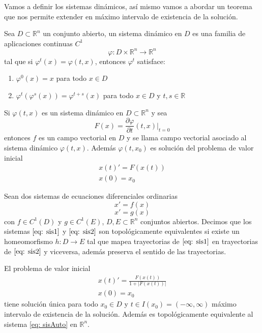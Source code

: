 Vamos a definir los sistemas dinámicos, así mismo vamos a abordar un teorema que nos permite extender en máximo intervalo de existencia de la solución.
 
\begin{definition}
	Sea $D\subset\mathbb{R}^n$ un conjunto abierto, un sistema dinámico en $D$ es una familia de aplicaciones continuas $C^1$
	$$\varphi:D\times\mathbb{R}^n\to\mathbb{R}^n$$
	tal que si $\varphi^t(x)=\varphi(t,x)$, entonces $\varphi^t$ satisface:
	\begin{enumerate}
		\item $\varphi^0(x)=x$ para todo $x\in D$
		\item $\varphi^t(\varphi^s(x))=\varphi^{t+s}(x)$ para todo $x\in D$ y $t,s\in\mathbb{R}$
	\end{enumerate}
\end{definition}

Si $\varphi(t,x)$ es un sistema dinámico en $D\subset\mathbb{R}^n$ y sea 
$$F(x)= \frac{\partial\varphi}{\partial t}(t,x)|_{t=0}$$
entonces $f$ es un campo vectorial en $D$ y se llama campo vectorial asociado al sistema dinámico $\varphi(t,x)$. Además $\varphi(t,x_0)$ es solución del problema de valor inicial
\begin{equation}\label{eq: sisAuto}
	\begin{matrix}
		x(t)'= F(x(t))\\
		x(0)=x_0
	\end{matrix}
\end{equation}

\begin{definition}
	Sean dos sistemas de ecuaciones diferenciales ordinarias
	\begin{equation}\label{eq: sis1}
		x'=f(x)
	\end{equation}
	\begin{equation}\label{eq: sis2}
		x'=g(x)
	\end{equation}
	con $f\in C^1(D)$ y $g\in C^1(E)$, $D,E\subset\mathbb{R}^n$ conjuntos abiertos. Decimos que los sistemas $\eqref{eq: sis1}$ y $\eqref{eq: sis2}$ son topológicamente equivalentes si existe un homeomorfismo $h:D\to E$ tal que mapea trayectorias de $\eqref{eq: sis1}$ en trayectorias de $\eqref{eq: sis2}$ y viceversa, además preserva el sentido de las trayectorias.
\end{definition}

\begin{definition}
	El problema de valor inicial
	\begin{equation}\label{eq: sisAuto}
		\begin{matrix}
			x(t)'= \frac{F(x(t))}{1+|F(x(t))|}\\
			x(0)=x_0
		\end{matrix}
	\end{equation}
	tiene solución única para todo $x_0\in D$ y $t\in I(x_0)=(-\infty,\infty)$ máximo intervalo de existencia de la solución. \cite{perko2001differential} Además es topológicamente equivalente al sistema \eqref{eq: sisAuto} en $\mathbb{R}^n$.
\end{definition}

